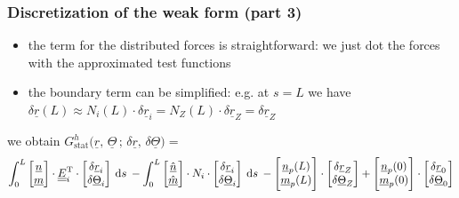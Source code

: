 \begin{frame}
  \frametitle{Discretization of the weak form (part 3)}
  
  \begin{itemize}
    \item the term for the distributed forces is straightforward: \newline
       we just dot the forces with the approximated test functions
    \item the boundary term can be simplified: e.g. at $s=L$ we have \newline
      $\delta \underline{r}(L) \approx N_i(L) \cdot \delta \underline{r}_i = N_Z(L) \cdot \delta \underline{r}_Z = \delta \underline{r}_Z$
  \end{itemize}
  
  \vspace{0.5em}
  we obtain $G_{\text{stat}}^h \bigl( \underline{r}, \, \underline{\Theta} \, ; \, \delta \underline{r}, \, \delta \underline{\Theta} \bigr) =$
  \begin{displaymath}
    \int_0^L
        \begin{bmatrix}
          \underline{n} \\ \underline{m}
        \end{bmatrix}
        \cdot \doubleunderline{E}_i^{\mathrm{T}} \cdot
        \begin{bmatrix}
          \delta \underline{r}_i \\ \delta \underline{\Theta}_i
        \end{bmatrix}
      \: \dif s \:
      - \int_0^L
        \begin{bmatrix}
          \underline{\hat{n}} \\ \underline{\hat{m}}
        \end{bmatrix} \cdot N_i \cdot
        \begin{bmatrix}
          \delta \underline{r}_i \\ \delta \underline{\Theta}_i
        \end{bmatrix}
      \: \dif s \:
      - \begin{bmatrix}
          \underline{n}_p(L) \\ \underline{m}_p(L)
      \end{bmatrix} \cdot
      \begin{bmatrix}
          \delta \underline{r}_Z \\ \delta \underline{\Theta}_Z
      \end{bmatrix}
      + \begin{bmatrix}
          \underline{n}_p(0) \\ \underline{m}_p(0)
      \end{bmatrix} \cdot
      \begin{bmatrix}
          \delta \underline{r}_0 \\ \delta \underline{\Theta}_0
      \end{bmatrix}
  \end{displaymath}
  

\end{frame}
